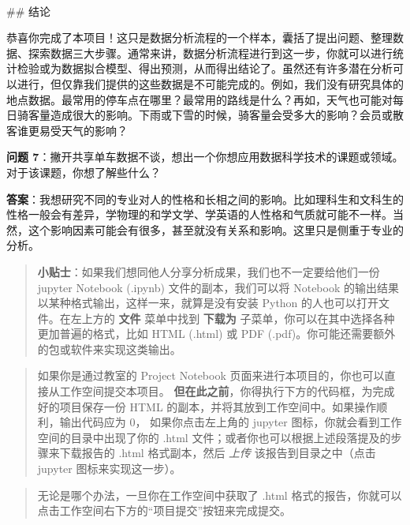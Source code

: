 \documentclass[11pt]{article}
\begin{document}
    \begin{center}
    \end{center}
    { \hspace*{\fill} \\}
    
     \#\# 结论

恭喜你完成了本项目！这只是数据分析流程的一个样本，囊括了提出问题、整理数据、探索数据三大步骤。通常来讲，数据分析流程进行到这一步，你就可以进行统计检验或为数据拟合模型、得出预测，从而得出结论了。虽然还有许多潜在分析可以进行，但仅靠我们提供的这些数据是不可能完成的。例如，我们没有研究具体的地点数据。最常用的停车点在哪里？最常用的路线是什么？再如，天气也可能对每日骑客量造成很大的影响。下雨或下雪的时候，骑客量会受多大的影响？会员或散客谁更易受天气的影响？

\textbf{问题
7}：撇开共享单车数据不谈，想出一个你想应用数据科学技术的课题或领域。对于该课题，你想了解些什么？

\textbf{答案}：我想研究不同的专业对人的性格和长相之间的影响。比如理科生和文科生的性格一般会有差异，学物理的和学文学、学英语的人性格和气质就可能不一样。当然，这个影响因素可能会有很多，甚至就没有关系和影响。这里只是侧重于专业的分析。

\begin{quote}
\textbf{小贴士}：如果我们想同他人分享分析成果，我们也不一定要给他们一份
jupyter Notebook (.ipynb) 文件的副本，我们可以将 Notebook
的输出结果以某种格式输出，这样一来，就算是没有安装 Python
的人也可以打开文件。在左上方的 \textbf{文件} 菜单中找到 \textbf{下载为}
子菜单，你可以在其中选择各种更加普遍的格式，比如 HTML (.html) 或 PDF
(.pdf)。你可能还需要额外的包或软件来实现这类输出。
\end{quote}

\begin{quote}
如果你是通过教室的 Project Notebook
页面来进行本项目的，你也可以直接从工作空间提交本项目。
\textbf{但在此之前}，你得执行下方的代码框，为完成好的项目保存一份 HTML
的副本，并将其放到工作空间中。如果操作顺利，输出代码应为 0，
如果你点击左上角的 jupyter 图标，你就会看到工作空间的目录中出现了你的
.html 文件；或者你也可以根据上述段落提及的步骤来下载报告的 .html
格式副本，然后 \emph{上传} 该报告到目录之中（点击 jupyter
图标来实现这一步）。
\end{quote}

\begin{quote}
无论是哪个办法，一旦你在工作空间中获取了 .html
格式的报告，你就可以点击工作空间右下方的``项目提交''按钮来完成提交。
\end{quote}
\end{document}
